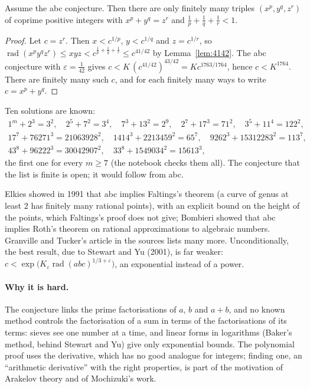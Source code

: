 \begin{theorem}\label{thm:fermatcatalan}
Assume the abc conjecture. Then there are only finitely many triples $(x^p,y^q,z^r)$ of coprime positive integers with $x^p+y^q=z^r$ and
$\frac1p+\frac1q+\frac1r<1$.
\end{theorem}
\begin{proof}
Let $c=z^r$. Then $x<c^{1/p}$, $y<c^{1/q}$ and $z=c^{1/r}$, so $\operatorname{rad}(x^py^qz^r)\le xyz<c^{\frac1p+\frac1q+\frac1r}\le c^{41/42}$ by
Lemma~\ref{lem:4142}. The abc conjecture with $\varepsilon=\frac1{42}$ gives $c<K\,(c^{41/42})^{43/42}=Kc^{1763/1764}$, hence $c<K^{1764}$. There are
finitely many such $c$, and for each finitely many ways to write $c=x^p+y^q$.
\end{proof}

Ten solutions are known:
\[
\begin{gathered}
1^m+2^3=3^2,\quad 2^5+7^2=3^4,\quad 7^3+13^2=2^9,\quad 2^7+17^3=71^2,\quad 3^5+11^4=122^2,\\
17^7+76271^3=21063928^2,\quad 1414^3+2213459^2=65^7,\quad 9262^3+15312283^2=113^7,\\
43^8+96222^3=30042907^2,\quad 33^8+1549034^2=15613^3,
\end{gathered}
\]
the first one for every $m\ge7$ (the notebook checks them all). The conjecture that the list is finite is open; it would follow from abc.

\begin{remark}\label{rem:abcmore}
Elkies showed in 1991 that abc implies Faltings's theorem (a curve of genus at least $2$ has finitely many rational points), with an explicit bound on
the height of the points, which Faltings's proof does not give; Bombieri showed that abc implies Roth's theorem on rational approximations to algebraic
numbers. Granville and Tucker's article in the sources lists many more. Unconditionally, the best result, due to Stewart and Yu (2001), is far weaker:
$c<\exp\bigl(K_\varepsilon\operatorname{rad}(abc)^{1/3+\varepsilon}\bigr)$, an exponential instead of a power.
\end{remark}

\paragraph{Why it is hard.} The conjecture links the prime factorisations of $a$, $b$ and $a+b$, and no known method controls the factorisation of a sum
in terms of the factorisations of its terms: sieves see one number at a time, and linear forms in logarithms (Baker's method, behind Stewart and Yu)
give only exponential bounds. The polynomial proof uses the derivative, which has no good analogue for integers; finding one, an ``arithmetic
derivative'' with the right properties, is part of the motivation of Arakelov theory and of Mochizuki's work.


